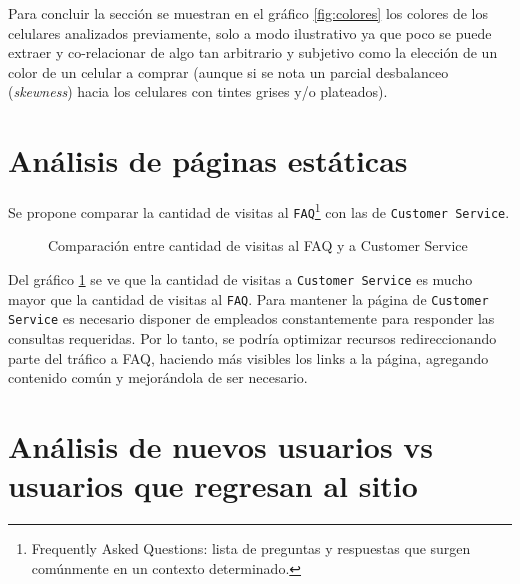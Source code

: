 \documentclass[a4paper]{article}
\begin{document}
Para concluir la sección se muestran en el gráfico \ref{fig:colores} los colores de los celulares analizados previamente, solo a modo ilustrativo ya que poco se puede extraer y co-relacionar de algo tan arbitrario y subjetivo como la elección de un color de un celular a comprar (aunque si se nota un parcial desbalanceo (\textit{skewness}) hacia los celulares con tintes grises y/o plateados).

\section{Análisis de páginas estáticas}

Se propone comparar la cantidad de visitas al \texttt{FAQ}\footnote{Frequently Asked Questions: lista de preguntas y respuestas que surgen comúnmente en un contexto determinado.} con las de \texttt{Customer Service}.

\begin{figure}[h!]
	\caption{Comparación entre cantidad de visitas al FAQ y a Customer Service}
	\label{fig:staticpage}
\end{figure}

Del gráfico \ref{fig:staticpage} se ve que la cantidad de visitas a \texttt{Customer Service} es mucho mayor que la cantidad de visitas al \texttt{FAQ}. Para mantener la página de \texttt{Customer Service} es necesario disponer de empleados constantemente para responder las consultas requeridas. Por lo tanto, se podría optimizar recursos redireccionando parte del tráfico a FAQ, haciendo más visibles los links a la página, agregando contenido común y mejorándola de ser necesario.

\section{Análisis de nuevos usuarios vs usuarios que regresan al sitio}
\end{document}
